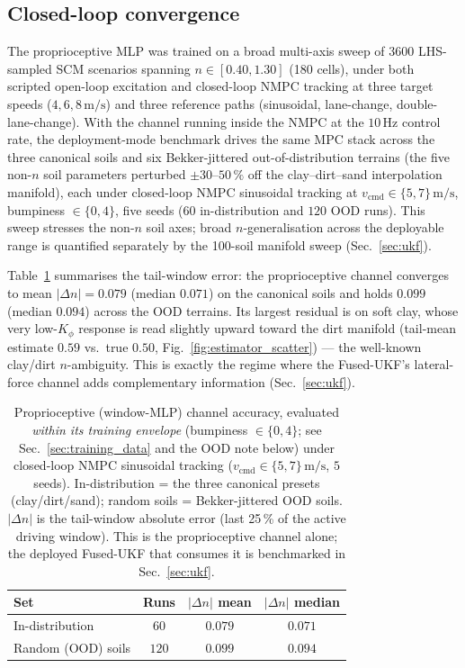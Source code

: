 \documentclass[conference,letterpaper,10pt]{IEEEtran}
\begin{document}
\subsection{Closed-loop convergence}
\label{sec:estimator_convergence}

The proprioceptive MLP was trained on a broad multi-axis sweep of 3600
LHS-sampled SCM scenarios spanning $n\in[0.40,1.30]$ (180 cells), under
both scripted open-loop excitation and closed-loop NMPC tracking at
three target speeds ($4,6,8\,\mathrm{m/s}$) and three reference paths
(sinusoidal, lane-change, double-lane-change). With the channel
running inside the NMPC at the $10\,\mathrm{Hz}$ control rate,
the deployment-mode benchmark drives the same MPC stack across the
three canonical soils and six Bekker-jittered out-of-distribution
terrains (the five non-$n$ soil parameters perturbed
$\pm 30\text{--}50\,\%$ off the clay--dirt--sand interpolation
manifold), each under closed-loop NMPC sinusoidal tracking at
$v_{\mathrm{cmd}}\!\in\!\{5,7\}\,\mathrm{m/s}$, bumpiness $\in\{0,4\}$,
five seeds ($60$ in-distribution and $120$ OOD runs). This sweep
stresses the non-$n$ soil axes; broad $n$-generalisation across the
deployable range is quantified separately by the 100-soil manifold
sweep (Sec.~\ref{sec:ukf}).

Table~\ref{tab:estimator_pilot} summarises the tail-window error: the
proprioceptive channel converges to mean $|\Delta n|=0.079$ (median
$0.071$) on the canonical soils and holds $0.099$ (median $0.094$)
across the OOD terrains. Its largest residual is on soft clay, whose
very low-$K_\phi$ response is read slightly upward toward the dirt
manifold (tail-mean estimate $0.59$ vs.\ true $0.50$,
Fig.~\ref{fig:estimator_scatter}) --- the well-known clay/dirt
$n$-ambiguity. This is exactly the regime where the Fused-UKF's
lateral-force channel adds complementary information
(Sec.~\ref{sec:ukf}).

\begin{table}[!t]
  \renewcommand{\arraystretch}{1.10}
  \caption{Proprioceptive (window-MLP) channel accuracy, evaluated
    \emph{within its training envelope} (bumpiness $\in\{0,4\}$; see
    Sec.~\ref{sec:training_data} and the OOD note below) under
    closed-loop NMPC sinusoidal tracking
    ($v_{\mathrm{cmd}}\in\{5,7\}\,\mathrm{m/s}$, $5$ seeds).
    In-distribution = the three canonical presets (clay/dirt/sand);
    random soils = Bekker-jittered OOD soils. $|\Delta n|$ is the
    tail-window absolute error (last 25\,\% of the active driving
    window). This is the proprioceptive channel alone; the deployed
    Fused-UKF that consumes it is benchmarked in Sec.~\ref{sec:ukf}.}
  \label{tab:estimator_pilot}
  \centering
  \begin{tabular}{lccc}
    \toprule
    \textbf{Set} & \textbf{Runs} &
    \textbf{$|\Delta n|$ mean} & \textbf{$|\Delta n|$ median}\\
    \midrule
    In-distribution    & $60$  & $0.079$ & $0.071$\\
    Random (OOD) soils & $120$ & $0.099$ & $0.094$\\
    \bottomrule
  \end{tabular}
\end{table}
\end{document}
